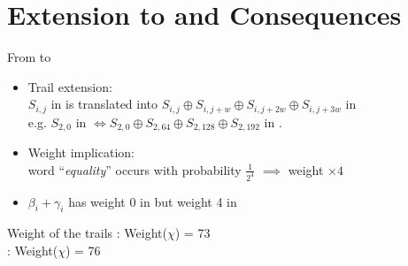 \documentclass[aspectratio=169,9pt]{beamer}
\begin{document}
\section{Extension to \MORUS and Consequences}


\begin{frame}{From \MiniMORUS to \MORUS}

\begin{itemize}
  \itemsep1.5em
  \item Trail extension:\\
    $S_{i,j}$ in \MiniMORUS is translated into $S_{i,j} \oplus S_{i,j + w} \oplus S_{i,j + 2w} \oplus S_{i,j + 3w}$ in \MORUS\\
    e.g. $S_{2,0}$ in \MiniMORUS[1280] $\iff S_{2,0} \oplus S_{2,64} \oplus S_{2,128} \oplus S_{2,192}$ in \MORUS[1280].
   \item Weight implication:\\
     word ``\textit{equality}'' occurs with probability $\frac{1}{2^4}$ $\implies$ weight $\times 4$\\

    \item $\beta_i + \gamma_i$ has weight 0 in \MiniMORUS but weight 4 in \MORUS\\
\end{itemize}

\begin{alertblock}{Weight of the trails}
  \centering
  \MORUS[640]: Weight($\chi$) = 73\\
  \MORUS[1280]: Weight($\chi$) = 76
\end{alertblock}

\end{frame}


\end{document}

